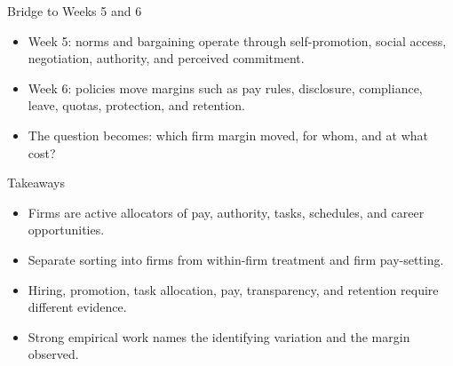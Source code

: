 \documentclass[aspectratio=169,11pt]{beamer}
\begin{document}
\begin{frame}{Bridge to Weeks 5 and 6}
\begin{itemize}
    \item Week 5: norms and bargaining operate through self-promotion, social access, negotiation, authority, and perceived commitment.
    \item Week 6: policies move margins such as pay rules, disclosure, compliance, leave, quotas, protection, and retention.
    \item The question becomes: which firm margin moved, for whom, and at what cost?
\end{itemize}
\end{frame}

\begin{frame}{Takeaways}
\begin{itemize}
    \item Firms are active allocators of pay, authority, tasks, schedules, and career opportunities.
    \item Separate sorting into firms from within-firm treatment and firm pay-setting.
    \item Hiring, promotion, task allocation, pay, transparency, and retention require different evidence.
    \item Strong empirical work names the identifying variation and the margin observed.
\end{itemize}
\end{frame}
\end{document}
